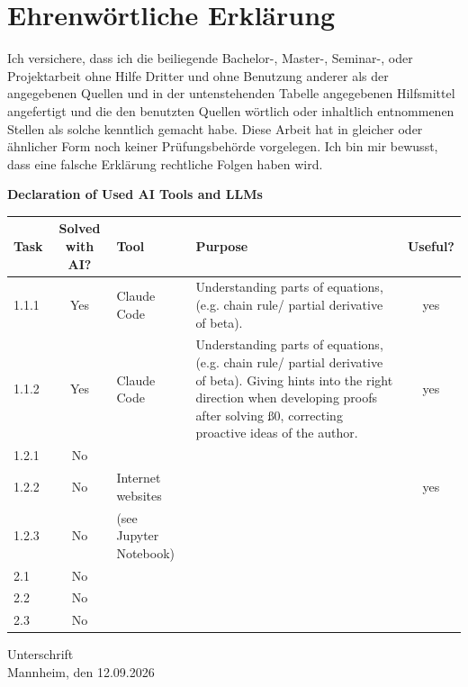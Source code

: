 \documentclass[11pt]{article}
\begin{document}
\section*{Ehrenwörtliche Erklärung}

Ich versichere, dass ich die beiliegende Bachelor-, Master-, Seminar-, oder
Projektarbeit ohne Hilfe Dritter und ohne Benutzung anderer als der angegebenen
Quellen und in der untenstehenden Tabelle angegebenen Hilfsmittel angefertigt
und die den benutzten Quellen wörtlich oder inhaltlich entnommenen Stellen als
solche kenntlich gemacht habe. Diese Arbeit hat in gleicher oder ähnlicher Form
noch keiner Prüfungsbehörde vorgelegen. Ich bin mir bewusst, dass eine falsche
Erklärung rechtliche Folgen haben wird.

%
%

\begin{center}
  \textbf{Declaration of Used AI Tools and LLMs} \\[.3em]
  \begin{tabularx}{\textwidth}{lclXc}
    \toprule
    Task & Solved with AI? & Tool & Purpose & Useful? \\
    \midrule
    1.1.1 & Yes & Claude Code &  Understanding parts of equations, (e.g. chain rule/ partial derivative of beta). & yes \\
    1.1.2 & Yes & Claude Code & Understanding parts of equations, (e.g. chain rule/ partial derivative of beta). Giving hints into the right direction when developing proofs after solving ß0, correcting proactive ideas of the author. & yes \\
    1.2.1 & No & & & \\
    1.2.2 & No & Internet websites & & yes\\
    1.2.3 & No & (see Jupyter Notebook) & & \\
    2.1 & No & & & \\
    2.2 & No & & & \\
    2.3 & No & & & \\
    \bottomrule
  \end{tabularx}
\end{center}

\vspace{2cm}
\noindent Unterschrift\\

\noindent Mannheim, den 12.09.2026 \hfill
\end{document}
